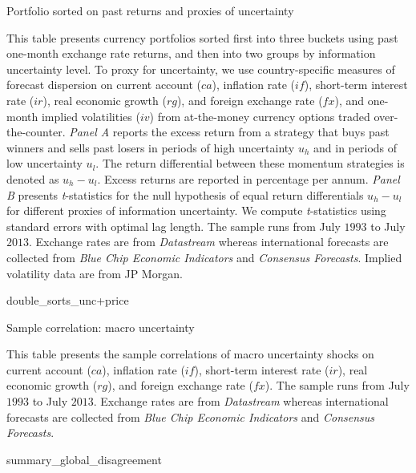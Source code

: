 \newpage
\clearpage
\begin{landscape}
	\begin{table}[ht]
		
		\caption{Portfolio sorted on past returns and proxies of uncertainty} \label{tab:double_sorts_unc+price}
		
		\begin{footnotesize}
			This table presents currency portfolios sorted first into three buckets using past one-month exchange rate returns, and then into two groups by information uncertainty level. To proxy for uncertainty, we use country-specific measures of forecast dispersion on current account ($ca$), inflation rate ($if$), short-term interest rate ($ir$), real economic growth ($rg$), and foreign exchange rate ($fx$), and one-month implied volatilities ($iv$) from at-the-money currency options traded over-the-counter. \emph{Panel A} reports the excess return from a strategy that buys past winners and sells past losers in periods of high uncertainty $u_h$ and in periods of low uncertainty $u_l$. The return differential between these momentum strategies is denoted as $u_h - u_l$. Excess returns are reported in percentage per annum. \emph{Panel B} presents \emph{t}-statistics for the null hypothesis of equal return differentials $u_h - u_l$ for different proxies of information uncertainty. We compute \emph{t}-statistics using \citet{newey_west1987} standard errors with \citet{andrews1991} optimal lag length. The sample runs from July $1993$ to July $2013$. Exchange rates are from \textit{Datastream} whereas international forecasts are collected from \textit{Blue Chip Economic Indicators} and \textit{Consensus Forecasts}. Implied volatility data are from JP Morgan.
		\end{footnotesize}
		
		{double_sorts_unc+price}
		
	\end{table}
\end{landscape}

\begin{landscape}
	\begin{table}[ht]
		
		\caption{Sample correlation: macro uncertainty} \label{tab:summary_global_disagreement}
		\begin{footnotesize}
			This table presents the sample correlations of macro uncertainty shocks on current account ($ca$), inflation rate ($if$), short-term interest rate ($ir$), real economic growth ($rg$), and foreign exchange rate ($fx$). The sample runs from July $1993$ to July $2013$. Exchange rates are from \textit{Datastream} whereas international forecasts are collected from \textit{Blue Chip Economic Indicators} and \textit{Consensus Forecasts}.
		\end{footnotesize}
		
		{summary_global_disagreement}
		
	\end{table}
\end{landscape}

